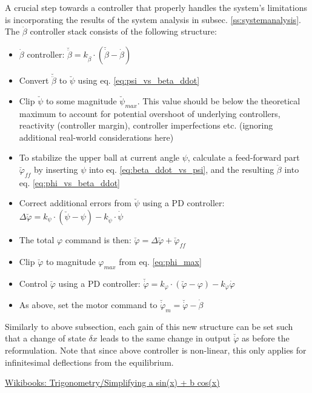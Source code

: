 \documentclass{article}
\begin{document}
A crucial step towards a controller that properly handles the system's limitations is incorporating the results of the system analysis in subsec. \ref{ss:systemanalysis}.
The $\dot{\beta}$ controller stack consists of the following structure:
\begin{itemize}
	\item{$\dot{\beta}$ controller: $\breve{\ddot{\beta}} = k_{\dot{\beta}} \cdot \left( \breve{\dot{\beta}} - \dot{\beta} \right)$}
	\item{Convert $\breve{\ddot{\beta}}$ to $\breve{\psi}$ using eq. \ref{eq:psi_vs_beta_ddot}}
	\item{Clip $\breve{\psi}$ to some magnitude $\breve{\psi}_{max}$. This value should be below the theoretical maximum to account for potential overshoot of underlying controllers, reactivity (controller margin), controller imperfections etc. (ignoring additional real-world considerations here)}
  \item{To stabilize the upper ball at current angle $\psi$, calculate a feed-forward part $\breve{\varphi}_{ff}$ by inserting $\psi$ into eq. \ref{eq:beta_ddot_vs_psi}, and the resulting $\ddot{\beta}$ into eq. \ref{eq:phi_vs_beta_ddot}}
  \item{Correct additional errors from $\breve{\psi}$ using a PD controller: $\Delta \breve{\varphi} =  k_{\psi} \cdot \left( \breve{\psi} - \psi \right) - k_{\dot{\psi}} \cdot \dot{\psi} $}
	\item{The total $\varphi$ command is then: $\breve{\varphi} = \Delta \breve{\varphi} + \breve{\varphi}_{ff} $}
  \item{Clip $\breve{\varphi}$ to magnitude $\varphi_{max}$ from eq. \ref{eq:phi_max}}
	\item{Control $\breve{\varphi}$ using a PD controller: $\breve{\dot{\varphi}} = k_{\varphi} \cdot \left( \breve{\varphi} - \varphi \right) - k_{\dot{\varphi}} \dot{\varphi}$}
	\item{As above, set the motor command to $\breve{\dot{\varphi}}_m = \breve{\dot{\varphi}} - \dot{\beta}$}
\end{itemize}
Similarly to above subsection, each gain of this new structure can be set such that a change of state $\delta x$ leads to the same change in output $\breve{\dot{\varphi}}$ as before the reformulation.
Note that since above controller is non-linear, this only applies for infinitesimal deflections from the equilibrium.

\begin{thebibliography}{1}

 \href{https://en.wikibooks.org/wiki/Trigonometry/Simplifying_a_sin(x)_+_b_cos(x)}{Wikibooks: Trigonometry/Simplifying a sin(x) + b cos(x)}

\end{thebibliography}
\end{document}
